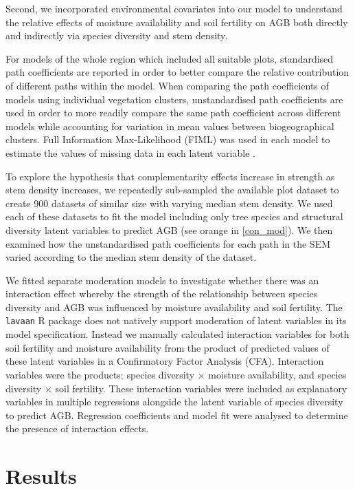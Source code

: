 \documentclass[11pt,a4paper]{article}
\begin{document}
Second, we incorporated environmental covariates into our model to understand the relative effects of moisture availability and soil fertility on AGB both directly and indirectly via species diversity and stem density. 

For models of the whole region which included all suitable plots, standardised path coefficients are reported in order to better compare the relative contribution of different paths within the model. When comparing the path coefficients of models using individual vegetation clusters, unstandardised path coefficients are used in order to more readily compare the same path coefficient across different models while accounting for variation in mean values between biogeographical clusters. Full Information Max-Likelihood (FIML) was used in each model to estimate the values of missing data in each latent variable \citep{Kline2005}.

To explore the hypothesis that complementarity effects increase in strength as stem density increases, we repeatedly sub-sampled the available plot dataset to create 900 datasets of similar size with varying median stem density. We used each of these datasets to fit the model including only tree species and structural diversity latent variables to predict AGB (see orange in \autoref{con_mod}). We then examined how the unstandardised path coefficients for each path in the SEM varied according to the median stem density of the dataset.

We fitted separate moderation models to investigate whether there was an interaction effect whereby the strength of the relationship between species diversity and AGB was influenced by moisture availability and soil fertility. The \verb|lavaan| R package does not natively support moderation of latent variables in its model specification. Instead we manually calculated interaction variables for both soil fertility and moisture availability from the product of predicted values of these latent variables in a Confirmatory Factor Analysis (CFA). Interaction variables were the products: species diversity $\times$ moisture availability, and species diversity $\times$ soil fertility. These interaction variables were included as explanatory variables in multiple regressions alongside the latent variable of species diversity to predict AGB. Regression coefficients and model fit were analysed to determine the presence of interaction effects.

\section{Results}
\end{document}
